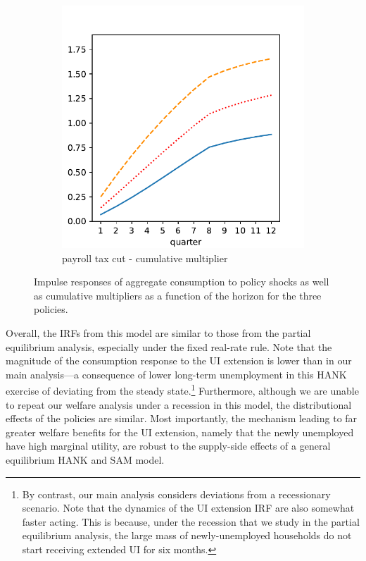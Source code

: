 \documentclass[\econtexRoot/HAFiscal]{subfiles}
\begin{document}
\begin{figure}[htb]
\begin{subfigure}[b]{.33\linewidth}
		\includegraphics[width=\linewidth]{Code/HA-Models/FromPandemicCode/Figures/HANK_tax_multiplier}
		\caption{payroll tax cut - cumulative multiplier}
		\notinsubfile{\label{fig:HANK_tax_multiplier}}
	\end{subfigure}
	\caption{Impulse responses of aggregate consumption to policy shocks as well as cumulative multipliers as a function of the horizon for the three policies. {\label{fig:HANK_IRFs}}}
\end{figure}



Overall, the IRFs from this model are similar to those from the partial equilibrium analysis, especially under the fixed real-rate rule. Note that the magnitude of the consumption response to the UI extension is lower than in our main analysis---a consequence of lower long-term unemployment in this HANK exercise of deviating from the steady state.\footnote{By contrast, our main analysis considers deviations from a recessionary scenario. Note that the dynamics of the UI extension IRF are also somewhat faster acting.
This is because, under the recession that we study in the partial equilibrium analysis, the large mass of newly-unemployed households do not start receiving extended UI for six months.
} Furthermore, although we are unable to repeat our welfare analysis under a recession in this model, the distributional effects of the policies are similar.
Most importantly, the mechanism leading to far greater welfare benefits for the UI extension, namely that the newly unemployed have high marginal utility, are robust to the supply-side effects of a general equilibrium HANK and SAM model.
\end{document}
